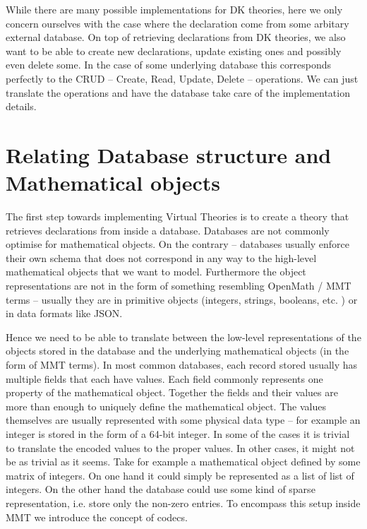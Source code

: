 \documentclass{deliverablereport}
\begin{document}
While there are many possible implementations for DK theories, here we only concern ourselves with the case where the declaration come from some arbitary external database. On top of retrieving declarations from DK theories, we also want to be able to create new declarations, update existing ones and possibly even delete some. In the case of some underlying database this corresponds perfectly to the CRUD -- Create, Read, Update, Delete -- operations. We can just translate the operations and have the database take care of the implementation details. 

\section{Relating Database structure and Mathematical objects}

The first step towards implementing Virtual Theories is to create a theory that retrieves declarations from inside a database. Databases are not commonly optimise for mathematical objects. On the contrary -- databases usually enforce their own schema that does not correspond in any way to the high-level mathematical objects that we want to model. Furthermore the object representations are not in the form of something resembling OpenMath / MMT terms -- usually they are in primitive objects (integers, strings, booleans, etc. ) or in data formats like JSON.

Hence we need to be able to translate between the low-level representations of the objects stored in the database and the underlying mathematical objects (in the form of MMT terms). In most common databases, each record stored usually has multiple fields that each have values. Each field commonly represents one property of the mathematical object. Together the fields and their values are more than enough to uniquely define the mathematical object. The values themselves are usually represented with some physical data type -- for example an integer is stored in the form of a 64-bit integer. In some of the cases it is trivial to translate the encoded values to the proper values. In other cases, it might not be as trivial as it seems. Take for example a mathematical object defined by some matrix of integers. On one hand it could simply be represented as a list of list of integers. On the other hand the database could use some kind of sparse representation, i.e. store only the non-zero entries. To encompass this setup inside MMT we introduce the concept of codecs.
\end{document}
